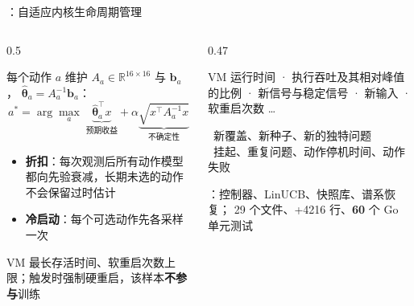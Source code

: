 \begin{frame}{\sa{}：自适应内核生命周期管理}
\begin{columns}[T,onlytextwidth]
\begin{column}{0.5\textwidth}
\begin{tcolorbox}[syzcard,title={上下文多臂老虎机}]
  每个动作 $a$ 维护 $A_a \in \mathbb{R}^{16\times16}$ 与 $\mathbf{b}_a$，
  $\hat{\boldsymbol\theta}_a = A_a^{-1}\mathbf{b}_a$：
  \[
    a^\ast = \arg\max_{a}\;
      \underbrace{\hat{\boldsymbol\theta}_a^{\top}x}_{\text{预期收益}}
      + \alpha\underbrace{\sqrt{x^{\top}A_a^{-1}x}}_{\text{不确定性}}
  \]
  \vspace{-4mm}
  \begin{itemize}
    \item \textbf{折扣}：每次观测后所有动作模型都向先验衰减，长期未选的动作不会保留过时估计
    \item \textbf{冷启动}：每个可选动作先各采样一次
  \end{itemize}
\end{tcolorbox}
\vspace{1mm}
\begin{tcolorbox}[tcbcard,title={\faIcon{shield-alt}\ 安全边界}]
  VM 最长存活时间、软重启次数上限；触发时强制硬重启，该样本\textbf{不参与}训练
\end{tcolorbox}
\end{column}
\begin{column}{0.47\textwidth}
\begin{tcolorbox}[rustcard,title={上下文 $x$（16 维，节选）}]
  VM 运行时间 · 执行吞吐及其相对峰值的比例 · 新信号与稳定信号 · 新输入 · 软重启次数 …
\end{tcolorbox}
\vspace{1mm}
\begin{tcolorbox}[accentcard,title={奖励（单位时间）}]
  \textcolor{SAOk}{\faPlus}\ 新覆盖、新种子、新的独特问题\\
  \textcolor{SAAccent}{\faMinus}\ 挂起、重复问题、动作停机时间、动作失败
\end{tcolorbox}
\vspace{1mm}
\begin{tcolorbox}[syzcard,title={实现与测试}]
  ：控制器、LinUCB、快照库、谱系恢复；
  29 个文件、+4216 行、\textbf{60} 个 Go 单元测试
\end{tcolorbox}
\end{column}
\end{columns}
\end{frame}
